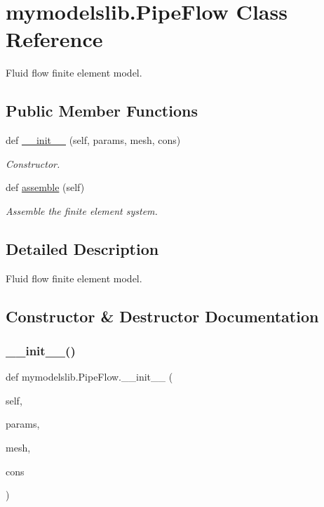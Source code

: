 \hypertarget{classmymodelslib_1_1PipeFlow}{}\section{mymodelslib.\+Pipe\+Flow Class Reference}
\label{classmymodelslib_1_1PipeFlow}


Fluid flow finite element model.  


\subsection*{Public Member Functions}
\begin{DoxyCompactItemize}
\item 
def \mbox{\hyperlink{classmymodelslib_1_1PipeFlow_a142f4cd5d0a701f262ee207dfc4a4d5a}{\+\_\+\+\_\+init\+\_\+\+\_\+}} (self, params, mesh, cons)
\begin{DoxyCompactList}\small\item\em Constructor. \end{DoxyCompactList}\item 
def \mbox{\hyperlink{classmymodelslib_1_1PipeFlow_a1991b384a370a7da78430eaf5f652033}{assemble}} (self)
\begin{DoxyCompactList}\small\item\em Assemble the finite element system. \end{DoxyCompactList}\end{DoxyCompactItemize}


\subsection{Detailed Description}
Fluid flow finite element model. 

\subsection{Constructor \& Destructor Documentation}
\mbox{\label{classmymodelslib_1_1PipeFlow_a142f4cd5d0a701f262ee207dfc4a4d5a}} 
\subsubsection{\texorpdfstring{\+\_\+\+\_\+init\+\_\+\+\_\+()}{\_\_init\_\_()}}
{\footnotesize\ttfamily def mymodelslib.\+Pipe\+Flow.\+\_\+\+\_\+init\+\_\+\+\_\+ (\begin{DoxyParamCaption}\item[{}]{self,  }\item[{}]{params,  }\item[{}]{mesh,  }\item[{}]{cons }\end{DoxyParamCaption})}



